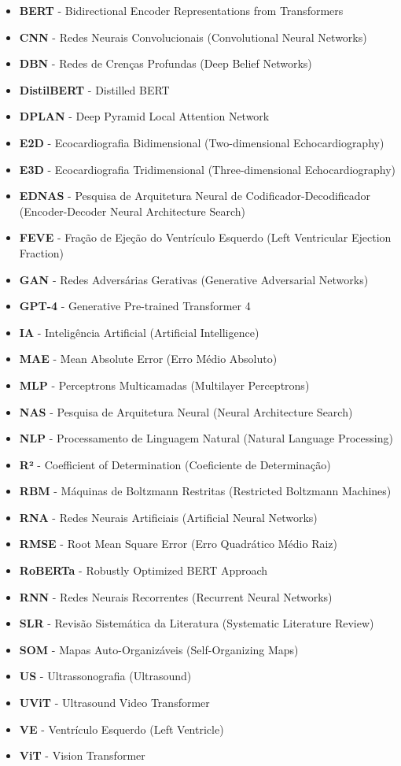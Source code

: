 \begin{itemize}
    \item \textbf{BERT} - Bidirectional Encoder Representations from Transformers
    \item \textbf{CNN} - Redes Neurais Convolucionais (Convolutional Neural Networks)
    \item \textbf{DBN} - Redes de Crenças Profundas (Deep Belief Networks)
    \item \textbf{DistilBERT} - Distilled BERT
    \item \textbf{DPLAN} - Deep Pyramid Local Attention Network
    \item \textbf{E2D} - Ecocardiografia Bidimensional (Two-dimensional Echocardiography)
    \item \textbf{E3D} - Ecocardiografia Tridimensional (Three-dimensional Echocardiography)
    \item \textbf{EDNAS} - Pesquisa de Arquitetura Neural de Codificador-Decodificador (Encoder-Decoder Neural Architecture Search)
    \item \textbf{FEVE} - Fração de Ejeção do Ventrículo Esquerdo (Left Ventricular Ejection Fraction)
    \item \textbf{GAN} - Redes Adversárias Gerativas (Generative Adversarial Networks)
    \item \textbf{GPT-4} - Generative Pre-trained Transformer 4
    \item \textbf{IA} - Inteligência Artificial (Artificial Intelligence)
    \item \textbf{MAE} - Mean Absolute Error (Erro Médio Absoluto)
    \item \textbf{MLP} - Perceptrons Multicamadas (Multilayer Perceptrons)
    \item \textbf{NAS} - Pesquisa de Arquitetura Neural (Neural Architecture Search)
    \item \textbf{NLP} - Processamento de Linguagem Natural (Natural Language Processing)
    \item \textbf{R²} - Coefficient of Determination (Coeficiente de Determinação)
    \item \textbf{RBM} - Máquinas de Boltzmann Restritas (Restricted Boltzmann Machines)
    \item \textbf{RNA} - Redes Neurais Artificiais (Artificial Neural Networks)
    \item \textbf{RMSE} - Root Mean Square Error (Erro Quadrático Médio Raiz)
    \item \textbf{RoBERTa} - Robustly Optimized BERT Approach
    \item \textbf{RNN} - Redes Neurais Recorrentes (Recurrent Neural Networks)
    \item \textbf{SLR} - Revisão Sistemática da Literatura (Systematic Literature Review)
    \item \textbf{SOM} - Mapas Auto-Organizáveis (Self-Organizing Maps)
    \item \textbf{US} - Ultrassonografia (Ultrasound)
    \item \textbf{UViT} - Ultrasound Video Transformer
    \item \textbf{VE} - Ventrículo Esquerdo (Left Ventricle)
    \item \textbf{ViT} - Vision Transformer
\end{itemize}
